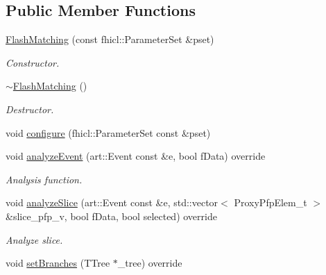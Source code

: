 \subsection*{Public Member Functions}
\begin{DoxyCompactItemize}
\item 
\hyperlink{classanalysis_1_1FlashMatching_a00eb9eca115b63fe442d1a14fb205692}{Flash\-Matching} (const fhicl\-::\-Parameter\-Set \&pset)
\begin{DoxyCompactList}\small\item\em Constructor. \end{DoxyCompactList}\item 
\hypertarget{classanalysis_1_1FlashMatching_ab2647643c3420bac36afe949ac252f20}{\hyperlink{classanalysis_1_1FlashMatching_ab2647643c3420bac36afe949ac252f20}{$\sim$\-Flash\-Matching} ()}\label{classanalysis_1_1FlashMatching_ab2647643c3420bac36afe949ac252f20}

\begin{DoxyCompactList}\small\item\em Destructor. \end{DoxyCompactList}\item 
void \hyperlink{classanalysis_1_1FlashMatching_a313d8dd41d24540555aaf27e87579626}{configure} (fhicl\-::\-Parameter\-Set const \&pset)
\item 
\hypertarget{classanalysis_1_1FlashMatching_ab3bc034486cadaeda1c4c0868a7f17f1}{void \hyperlink{classanalysis_1_1FlashMatching_ab3bc034486cadaeda1c4c0868a7f17f1}{analyze\-Event} (art\-::\-Event const \&e, bool f\-Data) override}\label{classanalysis_1_1FlashMatching_ab3bc034486cadaeda1c4c0868a7f17f1}

\begin{DoxyCompactList}\small\item\em Analysis function. \end{DoxyCompactList}\item 
void \hyperlink{classanalysis_1_1FlashMatching_acdff3053951979de66145a37a41f1767}{analyze\-Slice} (art\-::\-Event const \&e, std\-::vector$<$ Proxy\-Pfp\-Elem\-\_\-t $>$ \&slice\-\_\-pfp\-\_\-v, bool f\-Data, bool selected) override
\begin{DoxyCompactList}\small\item\em Analyze slice. \end{DoxyCompactList}\item 
\hypertarget{classanalysis_1_1FlashMatching_a40570b8e39ad953ba6acccbe5c466c49}{void \hyperlink{classanalysis_1_1FlashMatching_a40570b8e39ad953ba6acccbe5c466c49}{set\-Branches} (T\-Tree $\ast$\-\_\-tree) override}\label{classanalysis_1_1FlashMatching_a40570b8e39ad953ba6acccbe5c466c49}


\end{DoxyCompactItemize}
